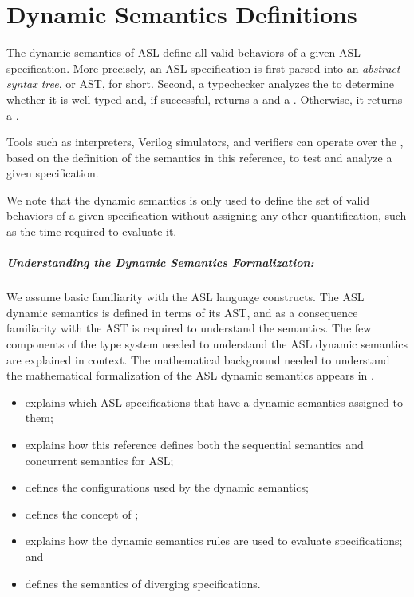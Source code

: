 \chapter{Dynamic Semantics Definitions\label{chap:Semantics}}

The dynamic semantics of ASL define all valid behaviors of a given ASL specification.
More precisely, an ASL specification is first parsed into an \emph{abstract syntax tree},
or AST, for short. Second, a typechecker analyzes the \emph{\untypedast} to determine whether it
is well-typed and, if successful, returns a \emph{\staticenvironmentterm{}} and a \emph{\typedast}.
Otherwise, it returns a \typingerrorterm{}.

Tools such as interpreters, Verilog simulators, and verifiers can operate over the \typedast,
based on the definition of the semantics in this reference, to test and analyze a given specification.

We note that the dynamic semantics is only used to define the set of valid behaviors
of a given specification without assigning any other quantification, such as the time
required to evaluate it.

\paragraph{Understanding the Dynamic Semantics Formalization:}
We assume basic familiarity with the ASL language constructs.
The ASL dynamic semantics is defined in terms of its AST,
and as a consequence familiarity with the AST is required to understand the semantics.
The few components of the type system needed to understand the ASL dynamic semantics are explained in context.
The mathematical background needed to understand the mathematical formalization
of the ASL dynamic semantics appears in .

\ChapterOutline
\begin{itemize}
  \item {} explains which ASL specifications that have a dynamic semantics
        assigned to them;
  \item {} explains how this reference defines both the
        sequential semantics and concurrent semantics for ASL;
  \item {} defines the configurations used by the dynamic semantics;
  \item {} defines the concept of \nativevaluesterm{};
  \item {} explains how the dynamic semantics rules are used to evaluate specifications; and
  \item {} defines the semantics of diverging specifications.
\end{itemize}

